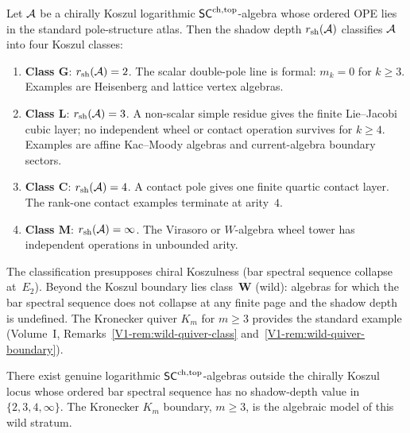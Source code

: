 \begin{theorem}
\label{thm:classification-shadow-depth}
Let\/ $\mathcal{A}$ be a chirally Koszul logarithmic\/ $\mathsf{SC}^{\mathrm{ch,top}}$-algebra
whose ordered OPE lies in the standard pole-structure atlas. Then
the shadow depth\/ $r_{\mathrm{sh}}(\mathcal{A})$ classifies\/ $\mathcal{A}$ into four
Koszul classes:
\begin{enumerate}[label=\textup{(\roman*)}]
\item \textbf{Class\/ $\mathbf{G}$}:
 $r_{\mathrm{sh}}(\mathcal{A})=2$. The scalar double-pole line is formal:
 $m_k=0$ for $k\ge3$. Examples are Heisenberg and lattice
 vertex algebras.
\item \textbf{Class\/ $\mathbf{L}$}:
 $r_{\mathrm{sh}}(\mathcal{A})=3$. A non-scalar simple residue gives the finite
 Lie--Jacobi cubic layer; no independent wheel or contact
 operation survives for $k\ge4$. Examples are affine
 Kac--Moody algebras and current-algebra boundary sectors.
\item \textbf{Class\/ $\mathbf{C}$}:
 $r_{\mathrm{sh}}(\mathcal{A})=4$. A contact pole gives one finite quartic
 contact layer. The rank-one contact examples terminate at
 arity~$4$.
\item \textbf{Class\/ $\mathbf{M}$}:
 $r_{\mathrm{sh}}(\mathcal{A})=\infty$. The Virasoro or $W$-algebra wheel tower
 has independent operations in unbounded arity.
\end{enumerate}
The classification presupposes chiral Koszulness \textup{(}bar spectral
sequence collapse at~$E_2$\textup{)}. Beyond the Koszul boundary lies
class~$\mathbf{W}$ \textup{(}wild\textup{)}: algebras for which the bar
spectral sequence does not collapse at any finite page and the shadow depth
is undefined. The Kronecker quiver $K_m$ for $m \geq 3$ provides the
standard example
\textup{(}Volume~I, Remarks~\textup{\ref*{V1-rem:wild-quiver-class}}
and~\textup{\ref*{V1-rem:wild-quiver-boundary}}\textup{)}.
\end{theorem}

\begin{conjecture}
\label{conj:type-H-existence}
\ClaimStatusConjectured
There exist genuine logarithmic $\mathsf{SC}^{\mathrm{ch,top}}$-algebras outside the
chirally Koszul locus whose ordered bar spectral sequence has no
shadow-depth value in $\{2,3,4,\infty\}$. The Kronecker
$K_m$ boundary, $m\ge3$, is the algebraic model of this wild
stratum.
\end{conjecture}

